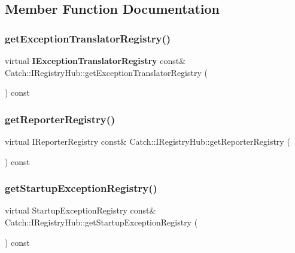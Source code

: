 \subsection{Member Function Documentation}
\mbox{\label{struct_catch_1_1_i_registry_hub_a48347c170d9c583af73027a27b2f0bd4}} 
\subsubsection{getExceptionTranslatorRegistry()}
{\footnotesize\ttfamily virtual \textbf{ I\+Exception\+Translator\+Registry} const\& Catch\+::\+I\+Registry\+Hub\+::get\+Exception\+Translator\+Registry (\begin{DoxyParamCaption}{ }\end{DoxyParamCaption}) const\hspace{0.3cm}{\ttfamily [pure virtual]}}

\mbox{\label{struct_catch_1_1_i_registry_hub_a55534563f7ecf7e20ec1e37285ebe54d}} 
\subsubsection{getReporterRegistry()}
{\footnotesize\ttfamily virtual I\+Reporter\+Registry const\& Catch\+::\+I\+Registry\+Hub\+::get\+Reporter\+Registry (\begin{DoxyParamCaption}{ }\end{DoxyParamCaption}) const\hspace{0.3cm}{\ttfamily [pure virtual]}}

\mbox{\label{struct_catch_1_1_i_registry_hub_a00281210628e6c616aca1d3e0d84db04}} 
\subsubsection{getStartupExceptionRegistry()}
{\footnotesize\ttfamily virtual Startup\+Exception\+Registry const\& Catch\+::\+I\+Registry\+Hub\+::get\+Startup\+Exception\+Registry (\begin{DoxyParamCaption}{ }\end{DoxyParamCaption}) const\hspace{0.3cm}{\ttfamily [pure virtual]}}


